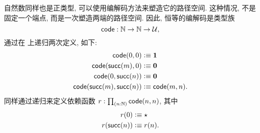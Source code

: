 %
%
自然数同样也是正类型, 可以使用编解码方法来塑造它的路径空间.
这种情况, 不是固定一个端点, 而是一次塑造两端的路径空间.
因此, 恒等的编解码是类型族
\[\mathsf{code}:\mathbb{N}\to\mathbb{N}\to\mathcal{U},\]
通过在 \N 上递归两次定义, 如下:
\begin{align*}
  \mathsf{code}(0,0) &\vcentcolon\equiv \mathbf{1}\\
  \mathsf{code}(\mathsf{succ}(m),0) &\vcentcolon\equiv \mathbf{0}\\
  \mathsf{code}(0,\mathsf{succ}(n)) &\vcentcolon\equiv \mathbf{0}\\
  \mathsf{code}(\mathsf{succ}(m),\mathsf{succ}(n)) &\vcentcolon\equiv \mathsf{code}(m,n).
\end{align*}
同样通过递归来定义依赖函数 $r:\prd{n:\N} \code(n,n)$, 其中
\begin{align*}
  r(0) &\vcentcolon\equiv \star\\
  r(\mathsf{succ}(n)) &\vcentcolon\equiv r(n).
\end{align*}

